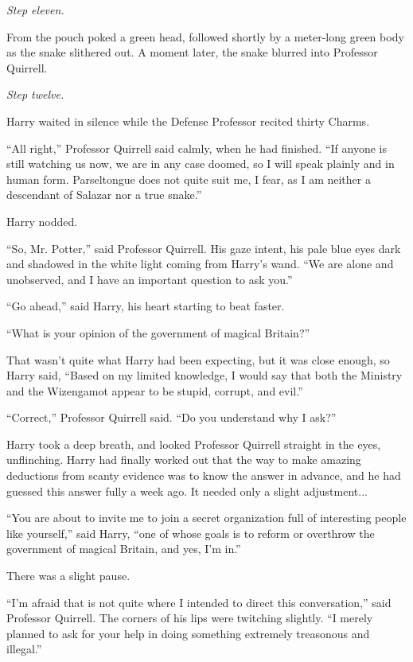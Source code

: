 \emph{Step eleven.}

From the pouch poked a green head, followed shortly by a meter-long green body as the snake slithered out. A moment later, the snake blurred into Professor Quirrell.

\emph{Step twelve.}

Harry waited in silence while the Defense Professor recited thirty Charms.

``All right,'' Professor Quirrell said calmly, when he had finished. ``If anyone is still watching us now, we are in any case doomed, so I will speak plainly and in human form. Parseltongue does not quite suit me, I fear, as I am neither a descendant of Salazar nor a true snake.''

Harry nodded.

``So, Mr. Potter,'' said Professor Quirrell. His gaze intent, his pale blue eyes dark and shadowed in the white light coming from Harry's wand. ``We are alone and unobserved, and I have an important question to ask you.''

``Go ahead,'' said Harry, his heart starting to beat faster.

``What is your opinion of the government of magical Britain?''

That wasn't quite what Harry had been expecting, but it was close enough, so Harry said, ``Based on my limited knowledge, I would say that both the Ministry and the Wizengamot appear to be stupid, corrupt, and evil.''

``Correct,'' Professor Quirrell said. ``Do you understand why I ask?''

Harry took a deep breath, and looked Professor Quirrell straight in the eyes, unflinching. Harry had finally worked out that the way to make amazing deductions from scanty evidence was to know the answer in advance, and he had guessed this answer fully a week ago. It needed only a slight adjustment...

``You are about to invite me to join a secret organization full of interesting people like yourself,'' said Harry, ``one of whose goals is to reform or overthrow the government of magical Britain, and yes, I'm in.''

There was a slight pause.

``I'm afraid that is not quite where I intended to direct this conversation,'' said Professor Quirrell. The corners of his lips were twitching slightly. ``I merely planned to ask for your help in doing something extremely treasonous and illegal.''

